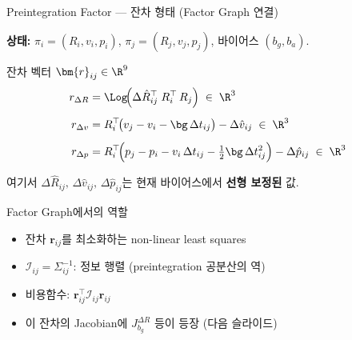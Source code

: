 \begin{frame}[shrink=10]{Preintegration Factor — 잔차 형태 (Factor Graph 연결)}

  \textbf{상태:} $\pi_i = (R_i, v_i, p_i)$,\; $\pi_j = (R_j, v_j, p_j)$,\; 바이어스 $(b_g, b_a)$.

  \pause
  \begin{block}{잔차 벡터 $\bm{r}_{ij} \in \R^9$}
    \begin{align*}
      r_{\Delta R}
        &= \Log\!\Bigl(\Delta\hat{R}_{ij}^\top\;R_i^\top\,R_j\Bigr)
        \;\in\;\R^3\\[5pt]
      r_{\Delta v}
        &= R_i^\top\!\bigl(v_j - v_i - \bg\,\Delta t_{ij}\bigr) - \Delta\hat{v}_{ij}
        \;\in\;\R^3\\[5pt]
      r_{\Delta p}
        &= R_i^\top\!\Bigl(p_j - p_i - v_i\,\Delta t_{ij} - \tfrac{1}{2}\bg\,\Delta t_{ij}^2\Bigr)
          - \Delta\hat{p}_{ij}
        \;\in\;\R^3
    \end{align*}
  \end{block}

  \pause
  여기서 $\Delta\hat{R}_{ij},\,\Delta\hat{v}_{ij},\,\Delta\hat{p}_{ij}$는 현재 바이어스에서 \textbf{선형 보정된} 값.

  \pause
  \vspace{0.2em}
  \begin{exampleblock}{Factor Graph에서의 역할}
    \begin{itemize}
      \item 잔차 $\bm{r}_{ij}$를 최소화하는 non-linear least squares
      \item $\mathcal{I}_{ij} = \Sigma_{ij}^{-1}$: 정보 행렬 (preintegration 공분산의 역)
      \item 비용함수: $\bm{r}_{ij}^\top \mathcal{I}_{ij} \bm{r}_{ij}$
      \item 이 잔차의 Jacobian에 $J_{b_g}^{\Delta R}$ 등이 등장 (다음 슬라이드)
    \end{itemize}
  \end{exampleblock}
\end{frame}


